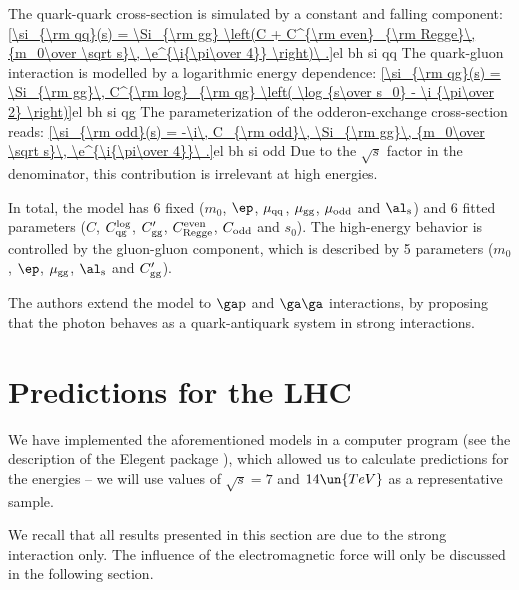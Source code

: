 The quark-quark cross-section is simulated by a constant and falling component:
\eqref{\si_{\rm qq}(s) = \Si_{\rm gg} \left(C + C^{\rm even}_{\rm Regge}\, {m_0\over \sqrt s}\, \e^{\i{\pi\over 4}} \right)\ .}{el bh si qq}
The quark-gluon interaction is modelled by a logarithmic energy dependence:
\eqref{\si_{\rm qg}(s) = \Si_{\rm gg}\, C^{\rm log}_{\rm qg} \left( \log {s\over s_0} - \i {\pi\over 2} \right)}{el bh si qg}
The parameterization of the odderon-exchange cross-section reads:
\eqref{\si_{\rm odd}(s) = -\i\, C_{\rm odd}\, \Si_{\rm gg}\, {m_0\over \sqrt s}\,  \e^{\i{\pi\over 4}}\ .}{el bh si odd}
Due to the $\sqrt s$ factor in the denominator, this contribution is irrelevant at high energies.


In total, the model has 6 fixed ($m_0$, $\ep$, $\mu_{\rm qq}$, $\mu_{\rm gg}$, $\mu_{\rm odd}$ and $\al_{\rm s}$) and 6 fitted parameters ($C$, $C^{\rm log}_{\rm qg}$, $C'_{\rm gg}$, $C^{\rm even}_{\rm Regge}$, $C_{\rm odd}$ and $s_0$). The high-energy behavior is controlled by the gluon-gluon component, which is described by 5 parameters ($m_0$, $\ep$, $\mu_{\rm gg}$, $\al_{\rm s}$ and $C'_{\rm gg}$).

The authors extend the model to $\rm\ga p$ and $\rm\ga\ga$ interactions, by proposing that the photon behaves as a quark-antiquark system in strong interactions.




\section[el pred]{Predictions for the LHC}

We have implemented the aforementioned models in a computer program (see the description of the Elegent package ), which allowed us to calculate predictions for the  energies -- we will use values of $\sqrt s = 7$ and $14\un{TeV}$ as a representative sample.

We recall that all results presented in this section are due to the strong interaction only. The influence of the electromagnetic force will only be discussed in the following section.


